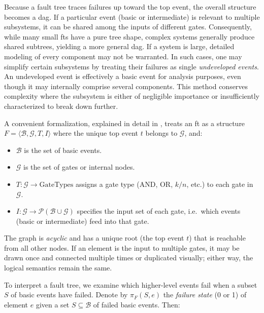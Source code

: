 Because a fault tree traces failures up toward the top event, the overall structure becomes a \acrshort{dag}. If a particular event (basic or intermediate) is relevant to multiple subsystems, it can be shared among the inputs of different gates. Consequently, while many small \acrshort{ft}s have a pure tree shape, complex systems generally produce shared subtrees, yielding a more general \acrshort{dag}. If a system is large, detailed modeling of every component may not be warranted. In such cases, one may simplify certain subsystems by treating their failures as single \emph{undeveloped events}. An undeveloped event is effectively a basic event for analysis purposes, even though it may internally comprise several components. This method conserves complexity where the subsystem is either of negligible importance or insufficiently characterized to break down further.

A convenient formalization, explained in detail in \cite{ruijters_fault_2015}, treats an \acrshort{ft} as a structure \(F = \langle \mathcal{B}, \mathcal{G}, T, I \rangle\) where the unique top event \(t\) belongs to \(\mathcal{G}\), and:

\begin{itemize}
\item \(\mathcal{B}\) is the set of basic events. 
\item \(\mathcal{G}\) is the set of gates or internal nodes.
\item \(T: \mathcal{G} \to \text{GateTypes}\) assigns a gate type (AND, OR, \(k/n\), etc.) to each gate in \(\mathcal{G}\).  
\item \(I: \mathcal{G} \to \mathcal{P}(\mathcal{B} \cup \mathcal{G})\) specifies the input set of each gate, i.e.\ which events (basic or intermediate) feed into that gate.  
\end{itemize}

The graph is \emph{acyclic} and has a unique root (the top event \(t\)) that is reachable from all other nodes. If an element is the input to multiple gates, it may be drawn once and connected multiple times or duplicated visually; either way, the logical semantics remain the same.

To interpret a fault tree, we examine which higher-level events fail when a subset \(S\) of basic events have failed. Denote by \(\pi_F(S, e)\) the \emph{failure state} (0 or 1) of element \(e\) given a set \(S\subseteq \mathcal{B}\) of failed basic events. Then:

